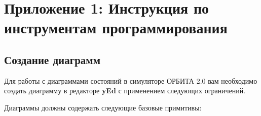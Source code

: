 \documentclass[12pt,a4paper]{article}
\begin{document}
\clearpage
\section*{Приложение 1: Инструкция по инструментам программирования}

\subsection*{Создание диаграмм}

Для работы с диаграммами состояний в симуляторе ОРБИТА 2.0 вам необходимо создать
диаграмму в редакторе \textbf{yEd} с применением следующих ограничений.

Диаграммы должны содержать следующие базовые примитивы:
\end{document}
